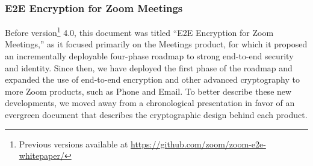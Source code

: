 \subsubsection{E2E Encryption for Zoom Meetings}
Before version\footnote{Previous versions available at
\url{https://github.com/zoom/zoom-e2e-whitepaper/}} 4.0, this document was titled ``E2E Encryption
for Zoom Meetings,'' as it focused primarily on the Meetings product, for which it proposed an
incrementally deployable four-phase roadmap to strong end-to-end security and identity. Since then,
we have deployed the first phase of the roadmap and expanded the use of end-to-end encryption and
other advanced cryptography to more Zoom products, such as Phone and Email. To better describe these
new developments, we moved away from a chronological presentation in favor of an evergreen document
that describes the cryptographic design behind each product.
